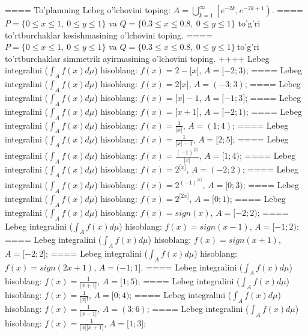 ====
To'plamning Lebeg o'lchovini toping: \(A = \bigcup_{k = 1}^{\infty}\left\lbrack e^{- 2k},e^{- 2k + 1} \right)\).
====
\(P = \{ 0 \leq x \leq 1,\ 0 \leq y \leq 1\}\) va \(Q = \{ 0.3 \leq x \leq 0.8,\ 0 \leq y \leq 1\}\) to'g'ri to'rtburchaklar kesishmasining o'lchovini toping.
====
\(P = \{ 0 \leq x \leq 1,\ 0 \leq y \leq 1\}\) va \(Q = \{ 0.3 \leq x \leq 0.8,\ 0 \leq y \leq 1\}\ \)to'g'ri to'rtburchaklar simmetrik ayirmasining o'lchovini toping.
++++
Lebeg integralini (\(\int_{A}^{}{f(x)d\mu}\)) hisoblang: \(f(x) = 2 - \lbrack x\rbrack\), \(A = \lbrack - 2;3)\);
====
Lebeg integralini (\(\int_{A}^{}{f(x)d\mu}\)) hisoblang: \(f(x) = 2\lbrack x\rbrack\), \(A = ( - 3;3)\);
====
Lebeg integralini (\(\int_{A}^{}{f(x)d\mu}\)) hisoblang: \(f(x) = \lbrack x\rbrack - 1\), \(A = \lbrack - 1;3\rbrack\);
====
Lebeg integralini (\(\int_{A}^{}{f(x)d\mu}\)) hisoblang: \(f(x) = \lbrack x + 1\rbrack\), \(A = \lbrack - 2;1)\);
====
Lebeg integralini (\(\int_{A}^{}{f(x)d\mu}\)) hisoblang: \(f(x) = \frac{1}{\lbrack x\rbrack}\), \(A = (1;4)\);
====
Lebeg integralini (\(\int_{A}^{}{f(x)d\mu}\)) hisoblang: \(f(x) = \frac{1}{\lbrack x\rbrack - 1}\), \(A = \lbrack 2;5\rbrack\);
====
Lebeg integralini (\(\int_{A}^{}{f(x)d\mu}\)) hisoblang: \(f(x) = \frac{( - 1)^{\lbrack x\rbrack}}{\lbrack x\rbrack}\), \(A = \lbrack 1;4)\);
====
Lebeg integralini (\(\int_{A}^{}{f(x)d\mu}\)) hisoblang: \(f(x) = 2^{\lbrack x\rbrack}\), \(A = ( - 2;2)\);
====
Lebeg integralini (\(\int_{A}^{}{f(x)d\mu}\)) hisoblang: \(f(x) = 2^{( - 1)^{\lbrack x\rbrack}}\), \(A = \lbrack 0;3)\);
====
Lebeg integralini (\(\int_{A}^{}{f(x)d\mu}\)) hisoblang: \(f(x) = 2^{\lbrack 2x\rbrack}\), \(A = \lbrack 0;1)\);
====
Lebeg integralini (\(\int_{A}^{}{f(x)d\mu}\)) hisoblang: \(f(x) = sign(x)\), \(A = \lbrack - 2;2)\);
====
Lebeg integralini (\(\int_{A}^{}{f(x)d\mu}\)) hisoblang: \(f(x) = sign(x - 1)\), \(A = \lbrack - 1;2)\);
====
Lebeg integralini (\(\int_{A}^{}{f(x)d\mu}\)) hisoblang: \(f(x) = sign(x + 1)\), \(A = \lbrack - 2;2\rbrack\);
====
Lebeg integralini (\(\int_{A}^{}{f(x)d\mu}\)) hisoblang: \(f(x) = sign(2x + 1)\), \(A = ( - 1;1\rbrack\).
====
Lebeg integralini (\(\int_{A}^{}{f(x)d\mu}\)) hisoblang: \(f(x) = \frac{1}{\lbrack x + 1\rbrack}\), \(A = \lbrack 1;5)\);
====
Lebeg integralini (\(\int_{A}^{}{f(x)d\mu}\)) hisoblang: \(f(x) = \frac{1}{\lbrack x\rbrack!}\), \(A = \lbrack 0;4)\);
====
Lebeg integralini (\(\int_{A}^{}{f(x)d\mu}\)) hisoblang: \(f(x) = \frac{1}{\lbrack x - 1\rbrack}\), \(A = (3;6)\);
====
Lebeg integralini (\(\int_{A}^{}{f(x)d\mu}\)) hisoblang: \(f(x) = \frac{1}{\lbrack x\rbrack\lbrack x + 1\rbrack}\), \(A = \lbrack 1;3\rbrack\);
